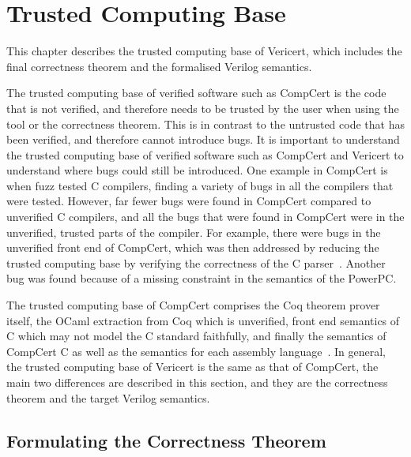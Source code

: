 \chapter{Trusted Computing Base}%
\label{sec:trusted-computing-base}

\begin{chapsummary}
  This chapter describes the trusted computing base of Vericert, which includes
  the final correctness theorem and the formalised Verilog semantics.
\end{chapsummary}

\noindent The trusted computing base of verified software such as CompCert is
the code that is not verified, and therefore needs to be trusted by the user
when using the tool or the correctness theorem.  This is in contrast to the
untrusted code that has been verified, and therefore cannot introduce bugs.  It
is important to understand the trusted computing base of verified software such
as CompCert and Vericert to understand where bugs could still be introduced.
One example in CompCert is when \textcite{yang11_findin_under_bugs_c_compil}
fuzz tested C compilers, finding a variety of bugs in all the compilers that
were tested.  However, far fewer bugs were found in CompCert compared to
unverified C compilers, and all the bugs that were found in CompCert were in the
unverified, trusted parts of the compiler.  For example, there were bugs in the
unverified front end of CompCert, which was then addressed by reducing the
trusted computing base by verifying the correctness of the C
parser~\cite{jourdan12_valid_lr_parser}.  Another bug was found because of a
missing constraint in the semantics of the PowerPC.

The trusted computing base of CompCert comprises the Coq theorem prover itself,
the OCaml extraction from Coq which is unverified, front end semantics of C
which may not model the C standard faithfully, and finally the semantics of
CompCert C as well as the semantics for each assembly
language~\cite{monniaux22_tcbcvc}.  In general, the trusted computing base of
Vericert is the same as that of CompCert, the main two differences are described
in this section, and they are the correctness theorem and the target Verilog
semantics.

\section{Formulating the Correctness Theorem}

